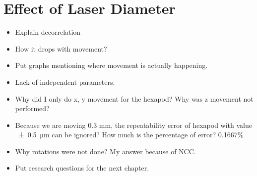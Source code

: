 \section{Effect of Laser Diameter}
\begin{itemize}
    \item Explain decorrelation
    \item How it drops with movement?
    \item Put graphs mentioning where movement is actually happening.
\end{itemize}

\begin{itemize}
    \item Lack of independent parameters.
    \item Why did I only do x, y movement for the hexapod? Why was z movement not performed?
    \item Because we are moving 0.3 mm, the repeatability error of hexapod with value \SI{\pm0.5}{\micro\meter} can be ignored? How much is the percentage of error? 0.1667\%
    \item Why rotations were not done? My answer because of NCC.
    \item Put research questions for the next chapter.
\end{itemize}